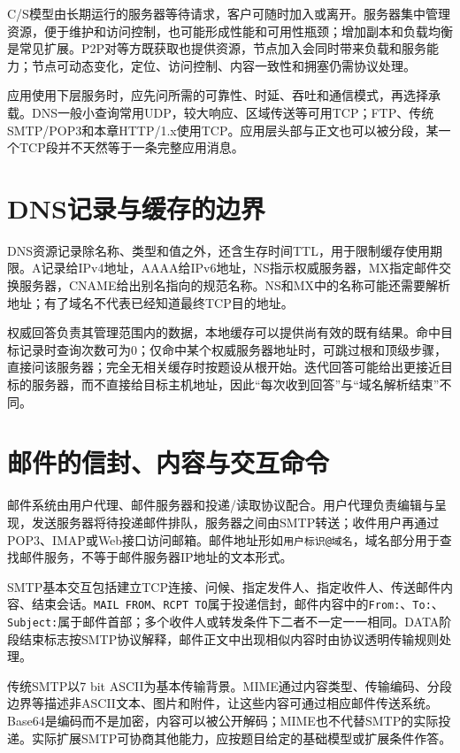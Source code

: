 C/S模型由长期运行的服务器等待请求，客户可随时加入或离开。服务器集中管理资源，便于维护和访问控制，也可能形成性能和可用性瓶颈；增加副本和负载均衡是常见扩展。P2P对等方既获取也提供资源，节点加入会同时带来负载和服务能力；节点可动态变化，定位、访问控制、内容一致性和拥塞仍需协议处理。

应用使用下层服务时，应先问所需的可靠性、时延、吞吐和通信模式，再选择承载。DNS一般小查询常用UDP，较大响应、区域传送等可用TCP；FTP、传统SMTP/POP3和本章HTTP/1.x使用TCP。应用层头部与正文也可以被分段，某一个TCP段并不天然等于一条完整应用消息。

\section{DNS记录与缓存的边界}\label{CN06-course-dns-records}

DNS资源记录除名称、类型和值之外，还含生存时间TTL，用于限制缓存使用期限。A记录给IPv4地址，AAAA给IPv6地址，NS指示权威服务器，MX指定邮件交换服务器，CNAME给出别名指向的规范名称。NS和MX中的名称可能还需要解析地址；有了域名不代表已经知道最终TCP目的地址。

权威回答负责其管理范围内的数据，本地缓存可以提供尚有效的既有结果。命中目标记录时查询次数可为0；仅命中某个权威服务器地址时，可跳过根和顶级步骤，直接问该服务器；完全无相关缓存时按题设从根开始。迭代回答可能给出更接近目标的服务器，而不直接给目标主机地址，因此``每次收到回答''与``域名解析结束''不同。

\section{邮件的信封、内容与交互命令}\label{CN06-course-mail}

邮件系统由用户代理、邮件服务器和投递/读取协议配合。用户代理负责编辑与呈现，发送服务器将待投递邮件排队，服务器之间由SMTP转送；收件用户再通过POP3、IMAP或Web接口访问邮箱。邮件地址形如\texttt{用户标识@域名}，域名部分用于查找邮件服务，不等于邮件服务器IP地址的文本形式。

SMTP基本交互包括建立TCP连接、问候、指定发件人、指定收件人、传送邮件内容、结束会话。\texttt{MAIL FROM}、\texttt{RCPT TO}属于投递信封，邮件内容中的\texttt{From:\allowbreak{}}、\texttt{To:\allowbreak{}}、\texttt{Subject:\allowbreak{}}属于邮件首部；多个收件人或转发条件下二者不一定一一相同。DATA阶段结束标志按SMTP协议解释，邮件正文中出现相似内容时由协议透明传输规则处理。

传统SMTP以7 bit ASCII为基本传输背景。MIME通过内容类型、传输编码、分段边界等描述非ASCII文本、图片和附件，让这些内容可通过相应邮件传送系统。Base64是编码而不是加密，内容可以被公开解码；MIME也不代替SMTP的实际投递。实际扩展SMTP可协商其他能力，应按题目给定的基础模型或扩展条件作答。

